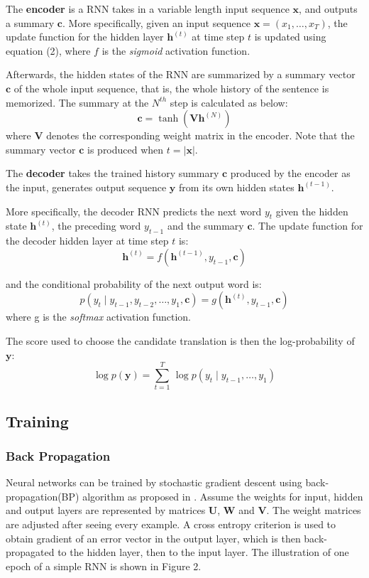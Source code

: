 \documentclass[11pt,letterpaper]{article}
\begin{document}
The \textbf{encoder} is a RNN takes in a variable length input sequence $\mathbf{x}$, and outputs a summary $\mathbf{c}$. More specifically, given an input sequence $\mathbf{x} = (x_1,\dotsc, x_T)$, the update function for the hidden layer $\mathbf{h}^{(t)}$ at time step $t$ is updated using equation (2), where $f$ is the \textit{sigmoid} activation function. 

Afterwards, the hidden states of the RNN are summarized by a summary vector $\mathbf{c}$ of the whole input sequence, that is, the whole history of the sentence is memorized. The summary at the $N^{th}$ step is calculated as below:
\begin{equation}
\mathbf{c} = \tanh(\mathbf{V}\mathbf{h}^{(N)})
\end{equation}
where $\mathbf{V}$ denotes the corresponding weight matrix in the encoder. Note that the summary vector $\mathbf{c}$ is produced when $t = |\mathbf{x}|$.

The \textbf{decoder} takes the trained history summary $\mathbf{c}$ produced by the encoder as the input, generates output sequence $\mathbf{y}$ from its own hidden states $\mathbf{h}^{(t-1)}$. 

More specifically, the decoder RNN predicts the next word $y_t$ given the hidden state $\mathbf{h}^{(t)}$, the preceding word $y_{t-1}$ and the summary $\mathbf{c}$. The update function for the decoder hidden layer at time step $t$ is:
\begin{equation}
\mathbf{h}^{(t)} = f(\mathbf{h}^{(t-1)}, y_{t-1}, \mathbf{c})
\end{equation}

and the conditional probability of the next output word is:
\begin{equation}
p(y_t\mid y_{t-1}, y_{t-2}, \dotsc, y_1, \mathbf{c}) = g (\mathbf{h}^{(t)}, y_{t-1}, \mathbf{c})
\end{equation}
where g is the \textit{softmax} activation function.

The score used to choose the candidate translation is then the log-probability of $\mathbf{y}$:
\begin{equation}
\log p(\mathbf{y}) = \sum\limits_{t=1}^T \, \log p(y_t\mid y_{t-1}, \dotsc , y_1)
\end{equation}

\subsection{Training}
\subsubsection{Back Propagation}
Neural networks can be trained by stochastic gradient descent using back-propagation(BP) algorithm as proposed in \cite{bp}. Assume the weights for input, hidden and output layers are represented by matrices $\mathbf{U}$, $\mathbf{W}$ and $\mathbf{V}$. The weight matrices are adjusted after seeing every example. A cross entropy criterion is used to  obtain gradient of an error vector in the output layer, which is then back-propagated to the hidden layer, then to the input layer. The illustration of one epoch of a simple RNN is shown in Figure 2. 
\end{document}
